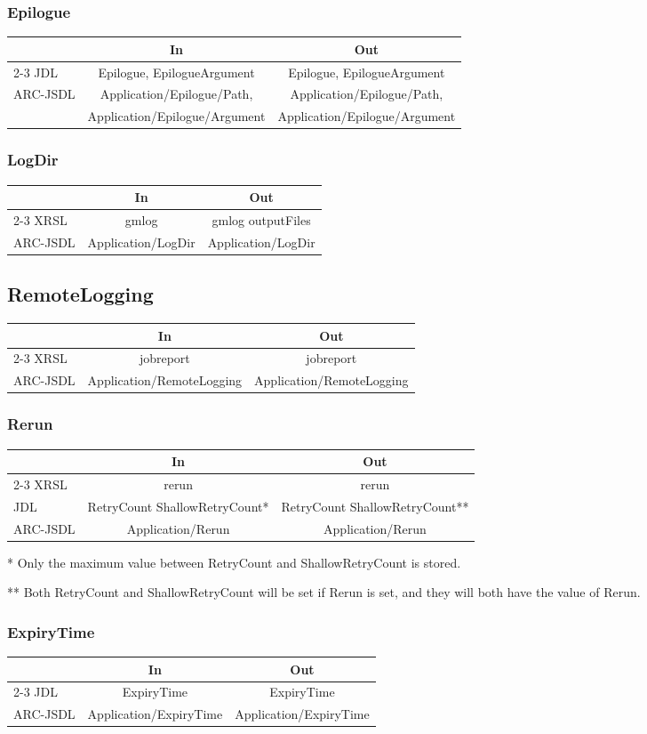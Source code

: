 \documentclass{article}
\newenvironment{inouttabular}%
{\begin{center}\begin{tabular}{l>{\ttfamily\footnotesize}c>{\ttfamily\footnotesize}c}%
\toprule
& \textnormal{\normalsize{In}} & \textnormal{\normalsize{Out}}\\ \cmidrule{2-3}}
{\bottomrule\end{tabular}\end{center}}
\begin{document}
\subsubsection{Epilogue}
\begin{inouttabular}
JDL & Epilogue, EpilogueArgument & Epilogue, EpilogueArgument\\
\multirow{2}{*}{ARC-JSDL} & Application/Epilogue/Path, & Application/Epilogue/Path,\\
& Application/Epilogue/Argument & Application/Epilogue/Argument\\
\end{inouttabular}

\subsubsection{LogDir}
\begin{inouttabular}
XRSL & gmlog & gmlog outputFiles\\
ARC-JSDL & Application/LogDir & Application/LogDir\\
\end{inouttabular}

\subsection{RemoteLogging}
\begin{inouttabular}
XRSL & jobreport & jobreport\\
ARC-JSDL & Application/RemoteLogging & Application/RemoteLogging\\
\end{inouttabular}

\subsubsection{Rerun}
\begin{inouttabular}
XRSL & rerun & rerun\\
JDL & RetryCount ShallowRetryCount* & RetryCount ShallowRetryCount**\\
ARC-JSDL & Application/Rerun & Application/Rerun\\
\end{inouttabular}
* Only the maximum value between RetryCount
and ShallowRetryCount is stored.

** Both RetryCount and ShallowRetryCount will be set if
Rerun is set, and they will both have the value of Rerun.

\subsubsection{ExpiryTime}
\begin{inouttabular}
JDL & ExpiryTime & ExpiryTime\\
ARC-JSDL & Application/ExpiryTime & Application/ExpiryTime\\
\end{inouttabular}
\end{document}
